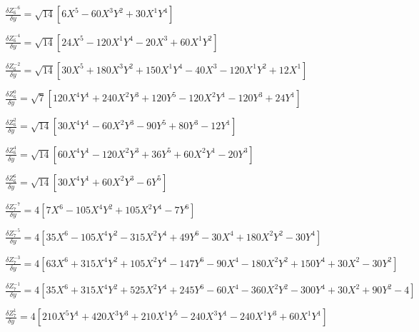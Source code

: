 \documentclass[10pt,landscape]{article}
\begin{document}
\vspace{1.2 mm}
\noindent $ \frac{\delta Z^{-6}_{6}}{\delta y} = \sqrt{14} [6X^{5} -60X^{3}Y^{2} +30X^{1}Y^{4}] $

\vspace{1.2 mm}
\noindent $ \frac{\delta Z^{-4}_{6}}{\delta y} = \sqrt{14} [24X^{5} -120X^{1}Y^{4} -20X^{3} +60X^{1}Y^{2}] $

\vspace{1.2 mm}
\noindent $ \frac{\delta Z^{-2}_{6}}{\delta y} = \sqrt{14} [30X^{5} +180X^{3}Y^{2} +150X^{1}Y^{4} -40X^{3} -120X^{1}Y^{2} +12X^{1}] $

\vspace{1.2 mm}
\noindent $ \frac{\delta Z^{0}_{6}}{\delta y} = \sqrt{7} [120X^{4}Y^{1} +240X^{2}Y^{3} +120Y^{5} -120X^{2}Y^{1} -120Y^{3} +24Y^{1}] $

\vspace{1.2 mm}
\noindent $ \frac{\delta Z^{2}_{6}}{\delta y} = \sqrt{14} [30X^{4}Y^{1} -60X^{2}Y^{3} -90Y^{5} +80Y^{3} -12Y^{1}] $

\vspace{1.2 mm}
\noindent $ \frac{\delta Z^{4}_{6}}{\delta y} = \sqrt{14} [60X^{4}Y^{1} -120X^{2}Y^{3} +36Y^{5} +60X^{2}Y^{1} -20Y^{3}] $

\vspace{1.2 mm}
\noindent $ \frac{\delta Z^{6}_{6}}{\delta y} = \sqrt{14} [30X^{4}Y^{1} +60X^{2}Y^{3} -6Y^{5}] $

\vspace{1.2 mm}
\noindent $ \frac{\delta Z^{-7}_{7}}{\delta y} = 4 [7X^{6} -105X^{4}Y^{2} +105X^{2}Y^{4} -7Y^{6}] $

\vspace{1.2 mm}
\noindent $ \frac{\delta Z^{-5}_{7}}{\delta y} = 4 [35X^{6} -105X^{4}Y^{2} -315X^{2}Y^{4} +49Y^{6} -30X^{4} +180X^{2}Y^{2} -30Y^{4}] $

\vspace{1.2 mm}
\noindent $ \frac{\delta Z^{-3}_{7}}{\delta y} = 4 [63X^{6} +315X^{4}Y^{2} +105X^{2}Y^{4} -147Y^{6} -90X^{4} -180X^{2}Y^{2} +150Y^{4} +30X^{2} -30Y^{2}] $

\vspace{1.2 mm}
\noindent $ \frac{\delta Z^{-1}_{7}}{\delta y} = 4 [35X^{6} +315X^{4}Y^{2} +525X^{2}Y^{4} +245Y^{6} -60X^{4} -360X^{2}Y^{2} -300Y^{4} +30X^{2} +90Y^{2} -4] $

\vspace{1.2 mm}
\noindent $ \frac{\delta Z^{1}_{7}}{\delta y} = 4 [210X^{5}Y^{1} +420X^{3}Y^{3} +210X^{1}Y^{5} -240X^{3}Y^{1} -240X^{1}Y^{3} +60X^{1}Y^{1}] $
\end{document}
